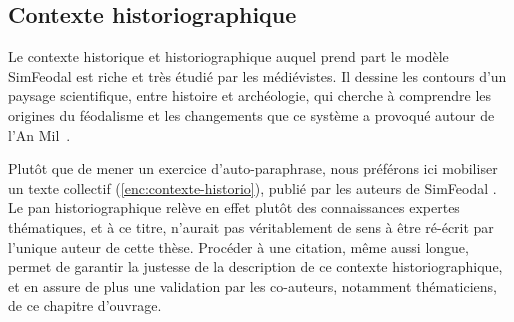 \subsection{Contexte historiographique \label{subsec:contexte-historio}}

Le contexte historique et historiographique auquel prend part le modèle SimFeodal est riche et très étudié par les médiévistes.
Il dessine les contours d'un paysage scientifique, entre histoire et archéologie, qui cherche à comprendre les origines du féodalisme et les changements que ce système a provoqué autour de l'\og{}An Mil\fg{}~\autocite{duby1967mil}.

Plutôt que de mener un exercice d'\og{}auto-paraphrase\fg{}, nous préférons ici mobiliser un texte collectif (\cref{enc:contexte-historio}), publié par les auteurs de SimFeodal \autocite[Introduction du chapitre]{cura_transition_2017}.
Le pan historiographique relève en effet plutôt des connaissances expertes thématiques, et à ce titre, n'aurait pas véritablement de sens à être ré-écrit par l'unique auteur de cette thèse.
Procéder à une citation, même aussi longue, permet de garantir la justesse de la description de ce contexte historiographique, et en assure de plus une validation par les co-auteurs, notamment thématiciens, de ce chapitre d'ouvrage.

